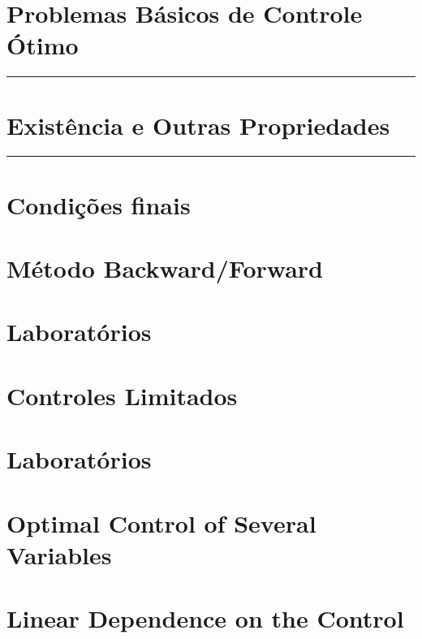 \documentclass[a4paper, 11pt, oneside]{book}
\theoremstyle{definition}
\begin{document}


\tableofcontents

\chapter{Problemas Básicos de Controle Ótimo}
\label{ch:1}
\rule{\textwidth}{1pt}


\chapter{Existência e Outras Propriedades}
\label{ch:2}
\rule{\textwidth}{1pt}


\chapter{Condições finais}


\chapter{Método Backward/Forward}


\chapter{Laboratórios}


\chapter{Controles Limitados}


\chapter{Laboratórios}


\chapter{Optimal Control of Several Variables}


\chapter{Linear Dependence on the Control}



\end{document}
